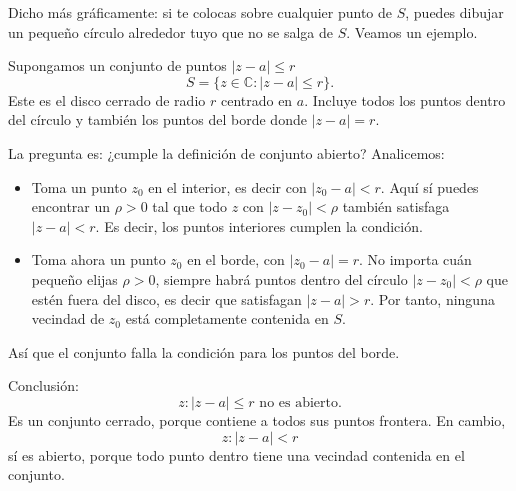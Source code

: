 Dicho más gráficamente: si te colocas sobre cualquier punto de \( S \), puedes dibujar un pequeño círculo alrededor tuyo que no se salga de \( S \). Veamos un ejemplo.
\begin{example}\label{ej:conjunto_cerrado}
  Supongamos un conjunto de puntos $\lvert z-a\rvert \leqslant r$
  \[
  S = \{z \in \mathbb{C} : |z - a| \leqslant r\}.
  \]
  Este es el disco cerrado de radio \(r\) centrado en \(a\). Incluye todos los puntos dentro del círculo y también los puntos del borde donde \(|z - a| = r\).

  La pregunta es: ¿cumple la definición de conjunto abierto? Analicemos:
  \begin{itemize}
  \item Toma un punto \(z_0\) en el interior, es decir con \(|z_0 - a| < r\).
   Aquí sí puedes encontrar un \(\rho > 0\) tal que todo \(z\) con \(|z - z_0| < \rho\) también satisfaga \(|z - a| < r\).
   Es decir, los puntos interiores cumplen la condición.

  \item Toma ahora un punto \(z_0\) en el borde, con \(|z_0 - a| = r\).
    No importa cuán pequeño elijas \(\rho > 0\), siempre habrá puntos dentro del círculo \(|z - z_0| < \rho\) que estén fuera del disco, es decir que satisfagan \(|z - a| > r\).
    Por tanto, ninguna vecindad de \(z_0\) está completamente contenida en \(S\).
  \end{itemize}
  Así que el conjunto falla la condición para los puntos del borde.

  Conclusión:
  \[
  \boxed{{z : |z - a| \leqslant r} \text{ no es abierto.}}
  \]
  Es un conjunto cerrado, porque contiene a todos sus puntos frontera. En cambio,
  \[
  {z : |z - a| < r}
  \]
  sí es abierto, porque todo punto dentro tiene una vecindad contenida en el conjunto.
\end{example}

